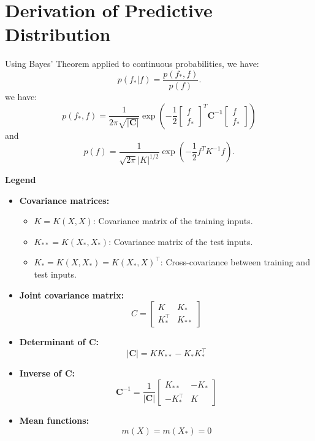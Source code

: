 \documentclass{ucdgradtaughtthesis}
\begin{document}
\newpage
 


\newpage
\appendix
\section{Derivation of Predictive Distribution}
\label{appendix:A}
Using Bayes' Theorem applied to continuous probabilities, we have:
\[
p(f_* | f) = \frac{p(f_*, f)}{p(f)}.
\]
we have:
$$p(f_*,f) = \frac{1}{2\pi\sqrt{\mathbf{|C|}}}\exp \left(-\frac{1}{2} 
\begin{bmatrix} f \\ f_*  \end{bmatrix}^T\mathbf{C^{-1}}\begin{bmatrix} f  \\ f_* \end{bmatrix}\right)$$
and 
\[
p(f) = \frac{1}{\sqrt{2\pi} |K|^{1/2}}
\exp \left(-\frac{1}{2} f^T K^{-1} f \right).
\]

\noindent
\textbf{Legend}
\begin{itemize}
    \item \textbf{Covariance matrices:}
    \begin{itemize}
        \item \( K = K(X, X) \): Covariance matrix of the training inputs.
        \item \( K_{**} = K(X_*, X_*) \): Covariance matrix of the test inputs.
        \item \( K_* = K(X, X_*) = K(X_*, X)^\top \): Cross-covariance between training and test inputs.
    \end{itemize}
    
    \item \textbf{Joint covariance matrix:}
    \[
    C = \begin{bmatrix}
    K & K_* \\
    K_*^\top & K_{**}
    \end{bmatrix}
    \]
    
    \item \textbf{Determinant of \( \mathbf{C} \):}
    \[
    |\mathbf{C}| = K K_{**} - K_* K_*^\top
    \]
    
    \item \textbf{Inverse of \( \mathbf{C} \):}
    \[
    \mathbf{C}^{-1} = \frac{1}{|\mathbf{C}|}
    \begin{bmatrix}
    K_{**} & -K_* \\
    -K_*^\top & K
    \end{bmatrix}
    \]
    
    \item \textbf{Mean functions:}
    \[
    m(X) = m(X_*) = 0
    \]
\end{itemize}
\end{document}
